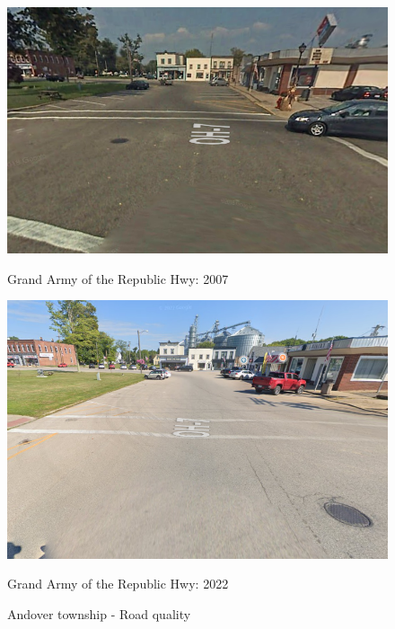 
\begin{figure}[htbp]
    \centering
    \begin{minipage}{0.49\textwidth}
        \centering
        \includegraphics[width=\textwidth,keepaspectratio]{images/andover_township_14grandarmy_2007.png}
        \caption*{Grand Army of the Republic Hwy: 2007} %
        \label{fig:andover_2007}
    \end{minipage}
    \hfill
    \begin{minipage}{0.49\textwidth}
        \centering
        \includegraphics[width=\textwidth,keepaspectratio]{images/andover_township_14grandarmy_2022.png}
        \caption*{Grand Army of the Republic Hwy: 2022}
        \label{fig:andover_2022}
    \end{minipage}
    \caption{Andover township - Road quality}
    \label{fig:rd_andover}
\end{figure}

